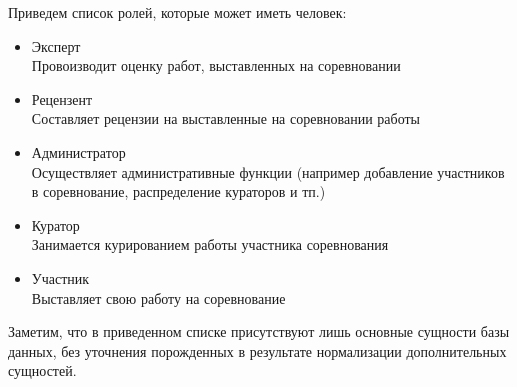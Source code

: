 Приведем список ролей, которые может иметь человек:
\begin{itemize}
    \item Эксперт \\
        Провоизводит оценку работ, выставленных на соревновании
    \item Рецензент \\
        Составляет рецензии на выставленные на соревновании работы
    \item Администратор \\
        Осуществляет административные функции (например добавление участников в соревнование,
                распределение кураторов и тп.)
    \item Куратор \\
        Занимается курированием работы участника соревнования
    \item Участник \\
        Выставляет свою работу на соревнование
\end{itemize}

Заметим, что в приведенном списке присутствуют лишь основные сущности базы данных, без
уточнения порожденных в результате нормализации дополнительных сущностей.

